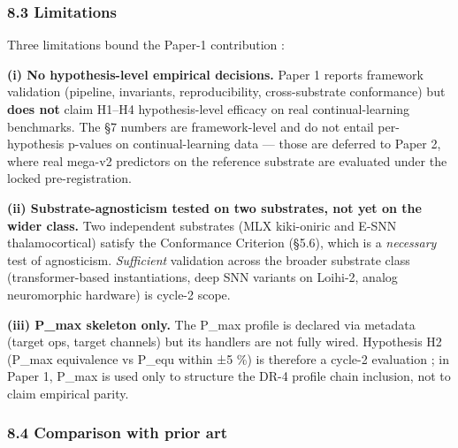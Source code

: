 \documentclass[
]{article}
\begin{document}
\subsubsection{8.3 Limitations}\label{limitations}

Three limitations bound the Paper-1 contribution :

\textbf{(i) No hypothesis-level empirical decisions.} Paper 1 reports
framework validation (pipeline, invariants, reproducibility,
cross-substrate conformance) but \textbf{does not} claim H1--H4
hypothesis-level efficacy on real continual-learning benchmarks. The §7
numbers are framework-level and do not entail per-hypothesis p-values on
continual-learning data --- those are deferred to Paper 2, where real
mega-v2 predictors on the reference substrate are evaluated under the
locked pre-registration.

\textbf{(ii) Substrate-agnosticism tested on two substrates, not yet on
the wider class.} Two independent substrates (MLX kiki-oniric and E-SNN
thalamocortical) satisfy the Conformance Criterion (§5.6), which is a
\emph{necessary} test of agnosticism. \emph{Sufficient} validation
across the broader substrate class (transformer-based instantiations,
deep SNN variants on Loihi-2, analog neuromorphic hardware) is cycle-2
scope.

\textbf{(iii) P\_max skeleton only.} The P\_max profile is declared via
metadata (target ops, target channels) but its handlers are not fully
wired. Hypothesis H2 (P\_max equivalence vs P\_equ within ±5 \%) is
therefore a cycle-2 evaluation ; in Paper 1, P\_max is used only to
structure the DR-4 profile chain inclusion, not to claim empirical
parity.

\subsubsection{8.4 Comparison with prior
art}\label{comparison-with-prior-art}
\end{document}
